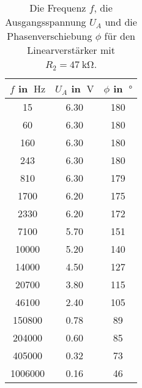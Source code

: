 \begin{table}
    \centering
    \begin{tabular}{c c c  }
        \toprule
        $f$ in $\qty{}{\hertz}$ & $U_A$ in $\qty{}{\V}$ & $\phi$ in $\qty{}{\degree} $\\
        \midrule   
        15&         6.30&   180 \\
        60&         6.30&   180 \\
        160&        6.30&   180 \\
        243&        6.30&   180 \\
        810&        6.30&   179 \\
        1700&       6.20&   175 \\
        2330&       6.20&   172 \\
        7100&       5.70&   151 \\
        10000&      5.20&   140 \\
        14000&      4.50&   127 \\
        20700&      3.80&   115 \\
        46100&      2.40&   105 \\
        150800&     0.78&   89  \\
        204000&     0.60&   85  \\
        405000&     0.32&   73  \\
        1006000&    0.16&   46  \\
        \bottomrule     
    \end{tabular}
    \caption{Die Frequenz $f$, die Ausgangsspannung $U_A$
     und die Phasenverschiebung $\phi$ für den Linearverstärker mit $R_2=\qty{47}{\kilo\ohm}$.}
    \label{tab:m3}
\end{table}

